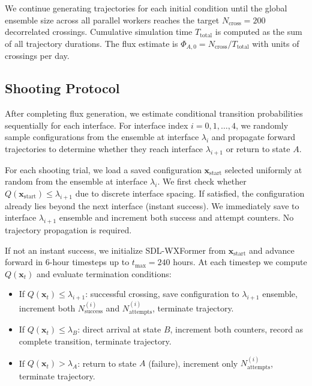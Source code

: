 \documentclass[11pt]{article}
\begin{document}
We continue generating trajectories for each initial condition until the global ensemble size across all parallel workers reaches the target $N_{\text{cross}} = 200$ decorrelated crossings. Cumulative simulation time $T_{\text{total}}$ is computed as the sum of all trajectory durations. The flux estimate is $\Phi_{A,0} = N_{\text{cross}}/T_{\text{total}}$ with units of crossings per day.

\subsection{Shooting Protocol}

After completing flux generation, we estimate conditional transition probabilities sequentially for each interface. For interface index $i = 0, 1, \ldots, 4$, we randomly sample configurations from the ensemble at interface $\lambda_i$ and propagate forward trajectories to determine whether they reach interface $\lambda_{i+1}$ or return to state $A$.

For each shooting trial, we load a saved configuration $\mathbf{x}_{\text{start}}$ selected uniformly at random from the ensemble at interface $\lambda_i$. We first check whether $Q(\mathbf{x}_{\text{start}}) \leq \lambda_{i+1}$ due to discrete interface spacing. If satisfied, the configuration already lies beyond the next interface (instant success). We immediately save to interface $\lambda_{i+1}$ ensemble and increment both success and attempt counters. No trajectory propagation is required.

If not an instant success, we initialize SDL-WXFormer from $\mathbf{x}_{\text{start}}$ and advance forward in 6-hour timesteps up to $t_{\text{max}} = 240$ hours. At each timestep we compute $Q(\mathbf{x}_t)$ and evaluate termination conditions:

\begin{itemize}
    \item If $Q(\mathbf{x}_t) \leq \lambda_{i+1}$: successful crossing, save configuration to $\lambda_{i+1}$ ensemble, increment both $N_{\text{success}}^{(i)}$ and $N_{\text{attempts}}^{(i)}$, terminate trajectory.
    
    \item If $Q(\mathbf{x}_t) \leq \lambda_B$: direct arrival at state $B$, increment both counters, record as complete transition, terminate trajectory.
    
    \item If $Q(\mathbf{x}_t) > \lambda_A$: return to state $A$ (failure), increment only $N_{\text{attempts}}^{(i)}$, terminate trajectory.
\end{itemize}
\end{document}
